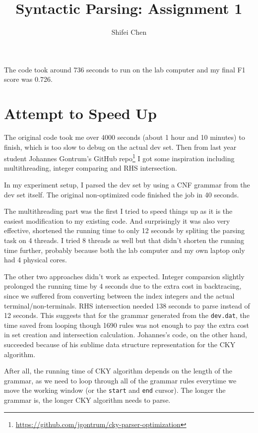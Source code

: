 \documentclass[11pt]{article} %
\title{{\LARGE Syntactic Parsing: Assignment 1}\\[1.5mm]} %
\author{Shifei Chen} %
\begin{document}
\maketitle

The code took around 736 seconds to run on the lab computer and my final F1 score was 0.726.

\section*{Attempt to Speed Up}

The original code took me over 4000 seconds (about 1 hour and 10 minutes) to finish, which is too slow to debug on the actual dev set. Then from last year student Johannes Gontrum's GitHub repo\footnote{\url{https://github.com/jgontrum/cky-parser-optimization}} I got some inspiration including multithreading, integer comparing and RHS intersection.

In my experiment setup, I parsed the dev set by using a CNF grammar from the dev set itself. The original non-optimized code finished the job in 40 seconds.

The multithreading part was the first I tried to speed things up as it is the easiest modification to my existing code. And surprisingly it was also very effective, shortened the running time to only 12 seconds by spliting the parsing task on 4 threads. I tried 8 threads as well but that didn't shorten the running time further, probably because both the lab computer and my own laptop only had 4 physical cores.

The other two approaches didn't work as expected. Integer comparsion slightly prolonged the running time by 4 seconds due to the extra cost in backtracing, since we suffered from converting between the index integers and the actual terminal/non-terminals. RHS intersection needed 138 seconds to parse instead of 12 seconds. This suggests that for the grammar generated from the \verb|dev.dat|, the time saved from looping though 1690 rules was not enough to pay the extra cost in set creation and intersection calculation. Johannes's code, on the other hand, succeeded because of his sublime data structure representation for the CKY algorithm. 

After all, the running time of CKY algorithm depends on the length of the grammar, as we need to loop through all of the grammar rules everytime we move the working window (or the \verb|start| and \verb|end| cursor). The longer the grammar is, the longer CKY algorithm needs to parse.\cite{Dunlop_optimizingcyk}

\printbibliography
\end{document}
